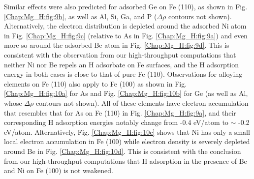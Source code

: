 Similar effects were also predicted for adsorbed Ge on Fe (110), as shown in Fig. \ref{Chap:Mg_H:fig:9b}, as well as Al, Si, Ga, and P ($\Delta \rho$ contours not shown). Alternatively, the electron distribution is depleted around the adsorbed Ni atom in Fig. \ref{Chap:Mg_H:fig:9c} (relative to As in Fig. \ref{Chap:Mg_H:fig:9a}) and even more so around the adsorbed Be atom in Fig. \ref{Chap:Mg_H:fig:9d}. This is consistent with the observation from our high-throughput computations that neither Ni nor Be repels an H adsorbate on Fe surfaces, and the H adsorption energy in both cases is close to that of pure Fe (110). Observations for alloying elements on Fe (110) also apply to Fe (100) as shown in Fig. \ref{Chap:Mg_H:fig:10a} for As and Fig. \ref{Chap:Mg_H:fig:10b} for Ge (as well as Al, whose $\Delta \rho$ contours not shown). All of these elements have electron accumulation that resembles that for As on Fe (110) in Fig. \ref{Chap:Mg_H:fig:9a}, and their corresponding H adsorption energies notably change from -0.4 eV/atom to $\sim$ -0.2 eV/atom. Alternatively, Fig. \ref{Chap:Mg_H:fig:10c} shows that Ni has only a small local electron accumulation in Fe (100) while electron density is severely depleted around Be in Fig. \ref{Chap:Mg_H:fig:10d}. This is consistent with the conclusion from our high-throughput computations that H adsorption in the presence of Be and Ni on Fe (100) is not weakened.


